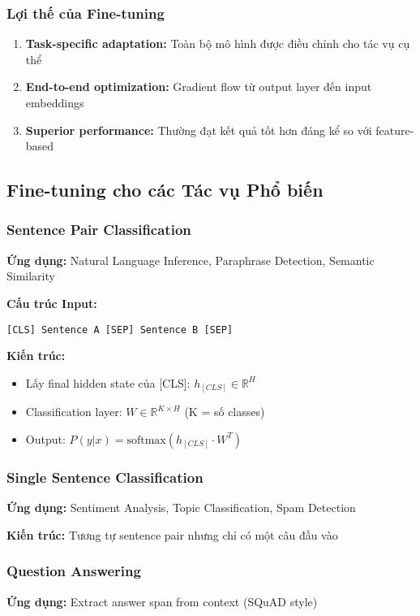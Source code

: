 \subsubsection{Lợi thế của Fine-tuning}
\begin{enumerate}
    \item \textbf{Task-specific adaptation:} Toàn bộ mô hình được điều chỉnh cho tác vụ cụ thể
    \item \textbf{End-to-end optimization:} Gradient flow từ output layer đến input embeddings
    \item \textbf{Superior performance:} Thường đạt kết quả tốt hơn đáng kể so với feature-based
\end{enumerate}

\subsection{Fine-tuning cho các Tác vụ Phổ biến}
\label{ssec:vi_du_tinh_chinh}

\subsubsection{Sentence Pair Classification}
\textbf{Ứng dụng:} Natural Language Inference, Paraphrase Detection, Semantic Similarity

\textbf{Cấu trúc Input:}
\begin{verbatim}
[CLS] Sentence A [SEP] Sentence B [SEP]
\end{verbatim}

\textbf{Kiến trúc:}
\begin{itemize}
    \item Lấy final hidden state của [CLS]: $h_{[CLS]} \in \mathbb{R}^H$
    \item Classification layer: $W \in \mathbb{R}^{K \times H}$ (K = số classes)
    \item Output: $P(y|x) = \text{softmax}(h_{[CLS]} \cdot W^T)$
\end{itemize}

\subsubsection{Single Sentence Classification}  
\textbf{Ứng dụng:} Sentiment Analysis, Topic Classification, Spam Detection

\textbf{Kiến trúc:} Tương tự sentence pair nhưng chỉ có một câu đầu vào

\subsubsection{Question Answering}
\textbf{Ứng dụng:} Extract answer span from context (SQuAD style)

